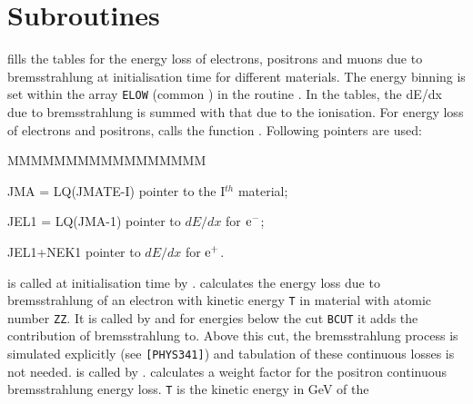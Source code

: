  

\section{Subroutines}
 fills the tables for the energy loss of electrons,
positrons and muons due to
bremsstrahlung at initialisation time for different materials.
The energy
binning is set within the array \texttt{ELOW} (common ) in the
routine . In the tables, the dE/dx due to bremsstrahlung
is summed with that due to the ionisation. For energy loss
of electrons and positrons,  calls the function . 
Following pointers are used:
\begin{DLtt}{MMMMMMMMMMMMMMMMM}
\item[JMA = LQ(JMATE-I)] pointer to the I$^{th}$ material;
\item[JEL1 = LQ(JMA-1)]  pointer to $dE/dx$ for $\mathrm{e}^-$;
\item[JEL1+NEK1]           pointer to $dE/dx$ for $\mathrm{e}^+$.
\end{DLtt}
 is called at initialisation time by .
 calculates the energy loss due to bremsstrahlung
of an electron with kinetic energy {\tt T} in material 
with atomic number {\tt ZZ}.
It is called by  and for energies below the cut
{\tt BCUT} it adds the contribution of bremsstrahlung to. 
Above this cut, the bremsstrahlung process is simulated
explicitly (see {\tt [PHYS341]}) and tabulation of these continuous losses
is not needed.  is called by .
 calculates a weight factor for the positron continuous
bremsstrahlung energy loss. {\tt T} is the kinetic energy in GeV of the 
